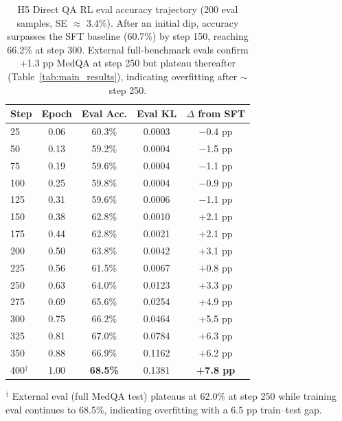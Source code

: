 \documentclass{article}
\begin{document}
\begin{table}[h]
\centering
\caption{H5 Direct QA RL eval accuracy trajectory (200 eval samples, SE $\approx$ 3.4\%). After an initial dip, accuracy surpasses the SFT baseline (60.7\%) by step 150, reaching 66.2\% at step 300. External full-benchmark evals confirm +1.3 pp MedQA at step 250 but plateau thereafter (Table~\ref{tab:main_results}), indicating overfitting after $\sim$step 250.}
\label{tab:h5_trajectory}
\begin{tabular}{lcccc}
\toprule
\textbf{Step} & \textbf{Epoch} & \textbf{Eval Acc.} & \textbf{Eval KL} & \textbf{$\Delta$ from SFT} \\
\midrule
25 & 0.06 & 60.3\% & 0.0003 & $-$0.4 pp \\
50 & 0.13 & 59.2\% & 0.0004 & $-$1.5 pp \\
75 & 0.19 & 59.6\% & 0.0004 & $-$1.1 pp \\
100 & 0.25 & 59.8\% & 0.0004 & $-$0.9 pp \\
125 & 0.31 & 59.6\% & 0.0006 & $-$1.1 pp \\
150 & 0.38 & 62.8\% & 0.0010 & +2.1 pp \\
175 & 0.44 & 62.8\% & 0.0021 & +2.1 pp \\
200 & 0.50 & 63.8\% & 0.0042 & +3.1 pp \\
225 & 0.56 & 61.5\% & 0.0067 & +0.8 pp \\
250 & 0.63 & 64.0\% & 0.0123 & +3.3 pp \\
275 & 0.69 & 65.6\% & 0.0254 & +4.9 pp \\
300 & 0.75 & 66.2\% & 0.0464 & +5.5 pp \\
325 & 0.81 & 67.0\% & 0.0784 & +6.3 pp \\
350 & 0.88 & 66.9\% & 0.1162 & +6.2 pp \\
400$^\dagger$ & 1.00 & \textbf{68.5\%} & 0.1381 & \textbf{+7.8 pp} \\
\bottomrule
\end{tabular}
\vspace{2pt}
{\footnotesize $^\dagger$ External eval (full MedQA test) plateaus at 62.0\% at step 250 while training eval continues to 68.5\%, indicating overfitting with a 6.5 pp train--test gap.}
\end{table}
\end{document}
